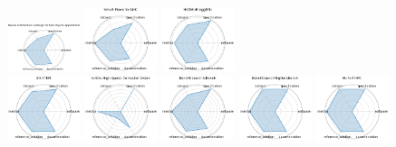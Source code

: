 \begin{figure}[ht!]
\includegraphics[width=0.1900\textwidth]{images/neural_architecture_codesign_for_fast_physics_applications_radar.pdf}
\includegraphics[width=0.1900\textwidth]{images/smart_pixels_for_lhc_radar.pdf}
\includegraphics[width=0.1900\textwidth]{images/hedm_braggnn_radar.pdf}
\\[1ex]
\includegraphics[width=0.1900\textwidth]{images/dstem_radar.pdf}
\includegraphics[width=0.1900\textwidth]{images/in-situ_high-speed_computer_vision_radar.pdf}
\includegraphics[width=0.1900\textwidth]{images/benchcouncil_aibench_radar.pdf}
\includegraphics[width=0.1900\textwidth]{images/benchcouncil_bigdatabench_radar.pdf}
\includegraphics[width=0.1900\textwidth]{images/mlperf_hpc_radar.pdf}

\end{figure}
